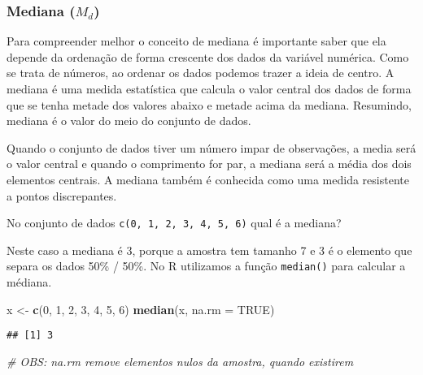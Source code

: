 \documentclass[12pt,]{style/krantz}
\makeatletter
\newenvironment{Shaded}{\begin{snugshade}}{\end{snugshade}}
\newcommand{\CommentTok}[1]{\textcolor[rgb]{0.56,0.35,0.01}{\textit{#1}}}
\newcommand{\DataTypeTok}[1]{\textcolor[rgb]{0.13,0.29,0.53}{#1}}
\newcommand{\DecValTok}[1]{\textcolor[rgb]{0.00,0.00,0.81}{#1}}
\newcommand{\KeywordTok}[1]{\textcolor[rgb]{0.13,0.29,0.53}{\textbf{#1}}}
\newcommand{\NormalTok}[1]{#1}
\newcommand{\OtherTok}[1]{\textcolor[rgb]{0.56,0.35,0.01}{#1}}
\newcommand{\StringTok}[1]{\textcolor[rgb]{0.31,0.60,0.02}{#1}}
\renewenvironment{quote}{\begin{VF}}{\end{VF}}
\newenvironment{kframe}{%
\medskip{}
\setlength{\fboxsep}{.8em}
 \def\at@end@of@kframe{}%
 \ifinner\ifhmode%
  \def\at@end@of@kframe{\end{minipage}}%
  \begin{minipage}{\columnwidth}%
 \fi\fi%
 \def\FrameCommand##1{\hskip\@totalleftmargin \hskip-\fboxsep
 \colorbox{shadecolor}{##1}\hskip-\fboxsep
     \hskip-\linewidth \hskip-\@totalleftmargin \hskip\columnwidth}%
 \MakeFramed {\advance\hsize-\width
   \@totalleftmargin\z@ \linewidth\hsize
   \@setminipage}}%
 {\par\unskip\endMakeFramed%
 \at@end@of@kframe}
\renewenvironment{Shaded}{\begin{kframe}}{\end{kframe}}
\theoremstyle{definition}
\theoremstyle{definition}
\theoremstyle{definition}
\theoremstyle{remark}
\let\BeginKnitrBlock\begin \let\EndKnitrBlock\end
\makeatother
\begin{document}
\hypertarget{mediana-m_d}{%
\subsubsection{\texorpdfstring{Mediana (\(M_d\))}{Mediana (M\_d)}}\label{mediana-m_d}}

Para compreender melhor o conceito de mediana é importante saber que ela depende da ordenação de forma crescente dos dados da variável numérica. Como se trata de números, ao ordenar os dados podemos trazer a ideia de centro. A mediana é uma medida estatística que calcula o valor central dos dados de forma que se tenha metade dos valores abaixo e metade acima da mediana. Resumindo, mediana é o valor do meio do conjunto de dados.

\begin{quote}
Quando o conjunto de dados tiver um número impar de observações, a media será o valor central e quando o comprimento for par, a mediana será a média dos dois elementos centrais. A mediana também é conhecida como uma medida resistente a pontos discrepantes.
\end{quote}

\BeginKnitrBlock{example}
\protect\hypertarget{exm:unnamed-chunk-40}{}{\label{exm:unnamed-chunk-40} }No conjunto de dados \texttt{c(0,\ 1,\ 2,\ 3,\ 4,\ 5,\ 6)} qual é a mediana?
\EndKnitrBlock{example}

Neste caso a mediana é 3, porque a amostra tem tamanho 7 e 3 é o elemento que separa os dados 50\% / 50\%. No R utilizamos a função \texttt{median()} para calcular a médiana.

\begin{Shaded}
\begin{Highlighting}[]
\NormalTok{x <-}\StringTok{ }\KeywordTok{c}\NormalTok{(}\DecValTok{0}\NormalTok{, }\DecValTok{1}\NormalTok{, }\DecValTok{2}\NormalTok{, }\DecValTok{3}\NormalTok{, }\DecValTok{4}\NormalTok{, }\DecValTok{5}\NormalTok{, }\DecValTok{6}\NormalTok{)}
\KeywordTok{median}\NormalTok{(x, }\DataTypeTok{na.rm =} \OtherTok{TRUE}\NormalTok{)}
\end{Highlighting}
\end{Shaded}

\begin{verbatim}
## [1] 3
\end{verbatim}

\begin{Shaded}
\begin{Highlighting}[]
\CommentTok{# OBS: na.rm remove elementos nulos da amostra, quando existirem}
\end{Highlighting}
\end{Shaded}
\end{document}
